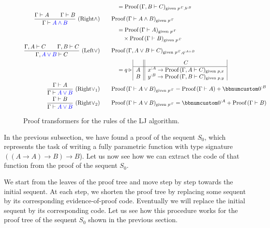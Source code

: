 \begin{figure}
\begin{centering}
{\begin{minipage}[t]{1\columnwidth - 2\fboxsep - 2\fboxrule}
{\begin{align*}
 & \quad\quad=\text{Proof}\,(\Gamma,B\vdash C)_{\text{given }p^{:\Gamma},b^{:B}}\\
\frac{\Gamma\vdash A\quad\quad\Gamma\vdash B}{\Gamma\vdash{\color{blue}A\wedge B}}~(\text{Right}\wedge)\quad & \quad\text{Proof}\,(\Gamma\vdash A\wedge B)_{\text{given }p^{:\Gamma}}\\
 & \quad\quad=\text{Proof}\,(\Gamma\vdash A)_{\text{given }p^{:\Gamma}}\\
 & \quad\quad\quad\times\text{Proof}\,(\Gamma\vdash B)_{\text{given }p^{:\Gamma}}\\
\frac{\Gamma,A\vdash C\quad\quad\Gamma,B\vdash C}{\Gamma,{\color{blue}A\vee B}\vdash C}~(\text{Left}\vee)\quad & \quad\text{Proof}\,(\Gamma,A\vee B\vdash C)_{\text{given }p^{:\Gamma},q^{:A+B}}\\
 & \quad\quad=q\triangleright\begin{array}{|c||c|}
 & C\\
\hline A & x^{:A}\rightarrow\text{Proof}\,(\Gamma,A\vdash C)_{\text{given }p,x}\\
B & y^{:B}\rightarrow\text{Proof}\,(\Gamma,B\vdash C)_{\text{given }p,y}
\end{array}\\
\frac{\Gamma\vdash A}{\Gamma\vdash{\color{blue}A\vee B}}~(\text{Right}\vee_{1})\quad & \quad\text{Proof}\,(\Gamma\vdash A\vee B)_{\text{given }p^{:\Gamma}}=\text{Proof}\,(\Gamma\vdash A)+\bbnum 0^{:B}\\
\frac{\Gamma\vdash B}{\Gamma\vdash{\color{blue}A\vee B}}~(\text{Right}\vee_{2})\quad & \quad\text{Proof}\,(\Gamma\vdash A\vee B)_{\text{given }p^{:\Gamma}}=\bbnum 0^{:A}+\text{Proof}\,(\Gamma\vdash B)
\end{align*}
\medskip{}
}%
\end{minipage}}{\small\par}
\par\end{centering}
\caption{\label{fig:proof-transformers-for-LJ-rules}Proof transformers for
the rules of the LJ algorithm.}
\end{figure}

In the previous subsection, we have found a proof of the sequent $S_{0}$,
which represents the task of writing a fully parametric function with
type signature $(\left(A\rightarrow A\right)\rightarrow B)\rightarrow B$).
Let us now see how we can extract the code of that function from the
proof of the sequent $S_{0}$.

We start from the leaves of the proof tree and move step by step towards
the initial sequent. At each step, we shorten the proof tree by replacing
some sequent by its corresponding evidence-of-proof code. Eventually
we will replace the initial sequent by its corresponding code. Let
us see how this procedure works for the proof tree of the sequent
$S_{0}$ shown in the previous section.

